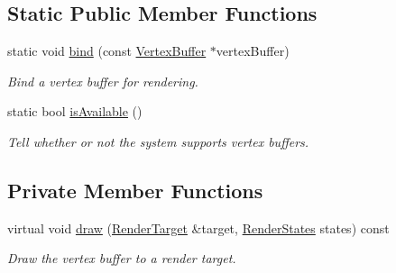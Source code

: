 \subsection*{Static Public Member Functions}
\begin{DoxyCompactItemize}
\item 
static void \mbox{\hyperlink{classsf_1_1_vertex_buffer_a1c623e9701b43125e4b3661bc0d0b65b}{bind}} (const \mbox{\hyperlink{classsf_1_1_vertex_buffer}{Vertex\+Buffer}} $\ast$vertex\+Buffer)
\begin{DoxyCompactList}\small\item\em Bind a vertex buffer for rendering. \end{DoxyCompactList}\item 
static bool \mbox{\hyperlink{classsf_1_1_vertex_buffer_a6304bc4134dc0164dc94eff887b08847}{is\+Available}} ()
\begin{DoxyCompactList}\small\item\em Tell whether or not the system supports vertex buffers. \end{DoxyCompactList}\end{DoxyCompactItemize}
\subsection*{Private Member Functions}
\begin{DoxyCompactItemize}
\item 
virtual void \mbox{\hyperlink{classsf_1_1_vertex_buffer_a3591a7fd52f502033b40755af71edc17}{draw}} (\mbox{\hyperlink{classsf_1_1_render_target}{Render\+Target}} \&target, \mbox{\hyperlink{classsf_1_1_render_states}{Render\+States}} states) const
\begin{DoxyCompactList}\small\item\em Draw the vertex buffer to a render target. \end{DoxyCompactList}\end{DoxyCompactItemize}
